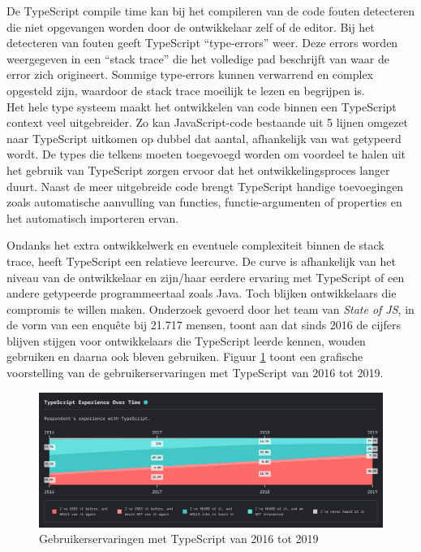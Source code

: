 De TypeScript compile time kan bij het compileren van de code fouten detecteren die niet opgevangen worden door de ontwikkelaar zelf of de editor. Bij het detecteren van fouten geeft TypeScript ``type-errors'' weer. Deze errors worden weergegeven in een ``stack trace'' die het volledige pad beschrijft van waar de error zich origineert. Sommige type-errors kunnen verwarrend en complex opgesteld zijn, waardoor de stack trace moeilijk te lezen en begrijpen is. \\
Het hele type systeem maakt het ontwikkelen van code binnen een TypeScript context veel uitgebreider. Zo kan JavaScript-code bestaande uit 5 lijnen omgezet naar TypeScript uitkomen op dubbel dat aantal, afhankelijk van wat getypeerd wordt. De types die telkens moeten toegevoegd worden om voordeel te halen uit het gebruik van TypeScript zorgen ervoor dat het ontwikkelingsproces langer duurt. Naast de meer uitgebreide code brengt TypeScript handige toevoegingen zoals automatische aanvulling van functies, functie-argumenten of properties en het automatisch importeren ervan.

Ondanks het extra ontwikkelwerk en eventuele complexiteit binnen de stack trace, heeft TypeScript een relatieve leercurve. De curve is afhankelijk van het niveau van de ontwikkelaar en zijn/haar eerdere ervaring met TypeScript of een andere getypeerde programmeertaal zoals Java. Toch blijken ontwikkelaars die compromis te willen maken. Onderzoek gevoerd door het team van \emph{State of JS}, in de vorm van een enquête bij 21.717 mensen, toont aan dat sinds 2016 de cijfers blijven stijgen voor ontwikkelaars die TypeScript leerde kennen, wouden gebruiken en daarna ook bleven gebruiken. Figuur \ref{fig:typescript-ervaring} toont een grafische voorstelling van de gebruikerservaringen met TypeScript van 2016 tot 2019.

\begin{figure}[H]
    \includegraphics[width=\linewidth]{img/TypescriptExperience.png}
    \caption[Gebruikerservaringen met TypeScript]{Gebruikerservaringen met TypeScript van 2016 tot 2019}
    \label{fig:typescript-ervaring}
\end{figure}

